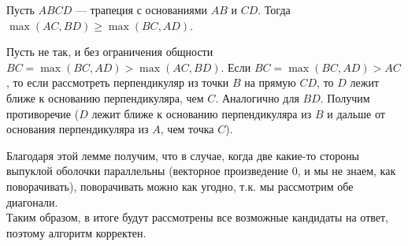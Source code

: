 \Statement Пусть $ABCD$ — трапеция с основаниями $AB$ и $CD$. Тогда $\max(AC, BD) \geqslant \max(BC, AD)$.

\Proof 
Пусть не так, и без ограничения общности $BC = \max(BC, AD) > \max(AC, BD)$. Если $BC = \max(BC, AD) > AC$, то если рассмотреть перпендикуляр из точки $B$ на прямую $CD$, то $D$ лежит ближе к основанию перпендикуляра, чем $C$.  Аналогично для $BD$. Получим противоречие ($D$ лежит ближе к основанию перпендикуляра из $B$ и дальше от основания перпендикуляра из $A$, чем точка $C$). 

\EndProof

Благодаря этой лемме получим, что в случае, когда две какие-то стороны выпуклой оболочки параллельны (векторное произведение $0$, и мы не знаем, как поворачивать), поворачивать можно как угодно, т.к. мы рассмотрим обе диагонали.\\

Таким образом, в итоге будут рассмотрены все возможные кандидаты на ответ, поэтому алгоритм корректен.
\newpage{}

